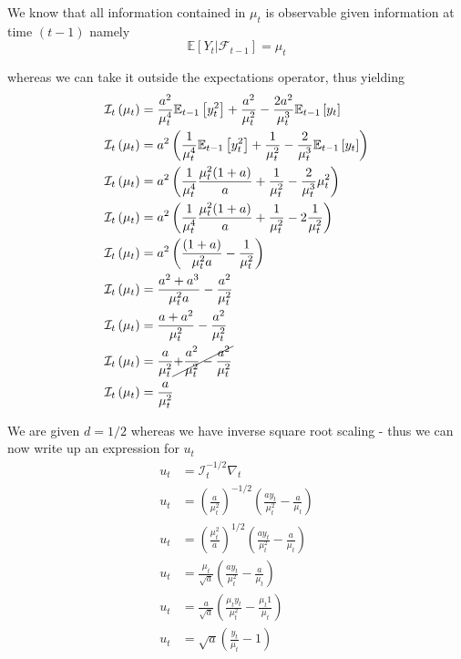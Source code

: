 \documentclass{article}
\begin{document}
We know that all information contained in $\mu_{t}$ is observable
given information at time $\left(t-1\right)$ namely
\[
\mathbb{E}\left[Y_{t}\rvert\mathcal{F}_{t-1}\right]=\mu_{t}
\]

whereas we can take it outside the expectations operator, thus yielding
\begin{align*}
\mathcal{I}_{t}\left(\mu_{t}\right) & =\frac{a^{2}}{\mu_{t}^{4}}\mathbb{E}_{t-1}\left[y_{t}^{2}\right]+\frac{a^{2}}{\mu_{t}^{2}}-\frac{2a^{2}}{\mu_{t}^{3}}\mathbb{E}_{t-1}\left[y_{t}\right]\\
\mathcal{I}_{t}\left(\mu_{t}\right) & =a^{2}\left(\frac{1}{\mu_{t}^{4}}\mathbb{E}_{t-1}\left[y_{t}^{2}\right]+\frac{1}{\mu_{t}^{2}}-\frac{2}{\mu_{t}^{3}}\mathbb{E}_{t-1}\left[y_{t}\right]\right)\\
\mathcal{I}_{t}\left(\mu_{t}\right) & =a^{2}\left(\frac{1}{\mu_{t}^{4}}\frac{\mu_{t}^{2}(1+a)}{a}+\frac{1}{\mu_{t}^{2}}-\frac{2}{\mu_{t}^{3}}\mu_{t}^{2}\right)\\
\mathcal{I}_{t}\left(\mu_{t}\right) & =a^{2}\left(\frac{1}{\mu_{t}^{4}}\frac{\mu_{t}^{2}(1+a)}{a}+\frac{1}{\mu_{t}^{2}}-2\frac{1}{\mu_{t}^{2}}\right)\\
\mathcal{I}_{t}\left(\mu_{t}\right) & =a^{2}\left(\frac{(1+a)}{\mu_{t}^{2}a}-\frac{1}{\mu_{t}^{2}}\right)\\
\mathcal{I}_{t}\left(\mu_{t}\right) & =\frac{a^{2}+a^{3}}{\mu_{t}^{2}a}-\frac{a^{2}}{\mu_{t}^{2}}\\
\mathcal{I}_{t}\left(\mu_{t}\right) & =\frac{a+a^{2}}{\mu_{t}^{2}}-\frac{a^{2}}{\mu_{t}^{2}}\\
\mathcal{I}_{t}\left(\mu_{t}\right) & =\frac{a}{\mu_{t}^{2}}\cancel{+\frac{a^{2}}{\mu_{t}^{2}}-\frac{a^{2}}{\mu_{t}^{2}}}\\
\mathcal{I}_{t}\left(\mu_{t}\right) & =\frac{a}{\mu_{t}^{2}}
\end{align*}

We are given $d=1/2$ whereas we have inverse square root scaling
- thus we can now write up an expression for $u_{t}$
\begin{align*}
u_{t} & =\mathcal{I}_{t}^{-1/2}\nabla_{t}\\
u_{t} & =\left(\frac{a}{\mu_{t}^{2}}\right)^{-1/2}\left(\frac{ay_{t}}{\mu_{t}^{2}}-\frac{a}{\mu_{t}}\right)\\
u_{t} & =\left(\frac{\mu_{t}^{2}}{a}\right)^{1/2}\left(\frac{ay_{t}}{\mu_{t}^{2}}-\frac{a}{\mu_{t}}\right)\\
u_{t} & =\frac{\mu_{t}}{\sqrt{a}}\left(\frac{ay_{t}}{\mu_{t}^{2}}-\frac{a}{\mu_{t}}\right)\\
u_{t} & =\frac{a}{\sqrt{a}}\left(\frac{\mu_{t}y_{t}}{\mu_{t}^{2}}-\frac{\mu_{t}1}{\mu_{t}}\right)\\
u_{t} & =\sqrt{a}\left(\frac{y_{t}}{\mu_{t}}-1\right)
\end{align*}
\end{document}
